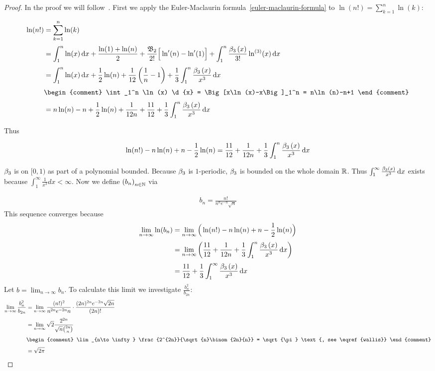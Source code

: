 \begin{proof}
  In the proof we will follow~\cite[pp. 227-228]{koenigsberger}. First we apply the Euler-Maclaurin formula~\eqref{euler-maclaurin-formula} to $\ln(n!)=\sum_{k=1}^n \ln(k)$:

  \begin{align}
    \ln(n!) & = \sum_{k=1}^n \ln(k) \nl
    & = \int_1^n \ln(x) \d{x} + \frac{\ln(1)+\ln(n)}{2} + \frac{\bn[2]}{2!} \Big[\ln'(n)-\ln'(1)\Big] + \int_1^n \frac{\bp[3]{x}}{3!} \ln^{(3)}(x) \d{x} \nl
    &= \int_1^n \ln(x) \d{x} + \frac 12 \ln(n) + \frac{1}{12} \left(\frac 1n - 1\right) + \frac 13 \int_1^n \frac{\bp[3]{x}}{x^3} \d{x} \nl
    & \begin{comment}
      \int_1^n \ln(x) \d{x} = \Big[x\ln(x)-x\Big]_1^n = n\ln(n)-n+1
    \end{comment} \nonumber \nl
    &= n\ln(n)-n+\frac 12 \ln(n) + \frac{1}{12n} + \frac{11}{12} + \frac{1}{3} \int_1^n \frac{\bp[3]{x}}{x^3}\d{x} 
  \end{align}

  \noindent Thus

  \begin{align}
    \ln(n!) - n\ln(n) + n - \frac 12 \ln(n) = \frac{11}{12} + \frac{1}{12n} + \frac 13 \int_1^n \frac{\bp[3]{x}}{x^3} \d{x}
  \end{align}

  $\bps[3]$ is on $[0,1)$ as part of a polynomial bounded. Because $\bps[3]$ is $1$-periodic, $\bps[3]$ is bounded on the whole domain $\R$. Thus $\int_1^\infty \frac{\bp[3]{x}}{x^3} \d{x}$ exists because $\int_1^\infty \frac 1{x^3} d{x} < \infty$. Now we define $\seq{b_n}$ via

  \begin{align}
    b_n = \frac{n!}{n^n e^{-n} \sqrt{n}}
  \end{align}
  This sequence converges because
  \begin{align}
    \lim_{n\to\infty} \ln(b_n) & = \lim_{n\to\infty} \Big( \ln(n!) -n \ln(n) + n - \frac 12\ln(n) \Big) \nl
    & = \lim_{n\to\infty} \left( \frac{11}{12} + \frac{1}{12n} + \frac 13\int_1^n \frac{\bp[3]{x}}{x^3} \d{x}\right) \nl
    & = \frac{11}{12} + \frac 13\int_1^{\infty} \frac{\bp[3]{x}}{x^3} \d{x}
  \end{align}
  Let $b=\lim_{n\to\infty} b_n$. To calculate this limit we investigate $\tfrac{b_n^2}{b_{2n}}$:
  \begin{align}
    \lim_{n\to\infty} \frac{b_n^2}{b_{2n}} &= \lim_{n\to\infty} \frac{(n!)^2}{n^{2n}e^{-2n} n} \cdot \frac{(2n)^{2n} e^{-2n} \sqrt{2n}}{(2n)!} \nl
    &= \lim_{n\to\infty} \sqrt{2} \frac{2^{2n}}{\sqrt{n}\binom{2n}{n}} \nl
    & \begin{comment}
    \lim_{n\to\infty} \frac{2^{2n}}{\sqrt{n}\binom{2n}{n}} = \sqrt{\pi} \text{, see \eqref{wallis}}
    \end{comment} \nonumber \nl
    & = \sqrt{2\pi}
  \end{align}


\end{proof}
